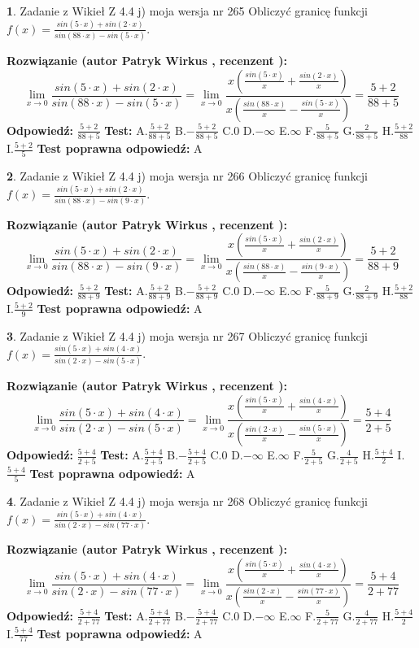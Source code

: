 \documentclass[12pt, a4paper]{article}
\theoremstyle{definition} %
\newtheorem{zad}{}
\newcommand{\zadStart}[1]{\begin{zad}#1\newline}
\newcommand{\zadStop}{\end{zad}}
\newcommand{\rozwStart}[2]{\noindent \textbf{Rozwiązanie (autor #1 , recenzent #2): }\newline}
\newcommand{\rozwStop}{\newline}
\newcommand{\odpStart}{\noindent \textbf{Odpowiedź:}\newline}
\newcommand{\odpStop}{\newline}
\newcommand{\testStart}{\noindent \textbf{Test:}\newline}
\newcommand{\testStop}{\newline}
\newcommand{\kluczStart}{\noindent \textbf{Test poprawna odpowiedź:}\newline}
\newcommand{\kluczStop}{\newline}
\begin{document}
\zadStart{Zadanie z Wikieł Z 4.4 j) moja wersja nr 265}
Obliczyć granicę funkcji $f(x)=\frac{sin(5\cdot x) +sin(2\cdot x)}{sin(88\cdot x) -sin(5\cdot x)}$.
\zadStop
\rozwStart{Patryk Wirkus}{}
$$\lim\limits_{x\to 0}\frac{sin(5\cdot x) +sin(2\cdot x)}{sin(88\cdot x) -sin(5\cdot x)}=\lim\limits_{x\to 0}\frac{x(\frac{sin(5\cdot x)}{x}+\frac{sin(2\cdot x)}{x})}{x(\frac{sin(88\cdot x)}{x}-\frac{sin(5\cdot x)}{x})}=\frac{5+2}{88+5}$$
\rozwStop
\odpStart
$\frac{5+2}{88+5}$
\odpStop
\testStart
A.$\frac{5+2}{88+5}$
B.$-\frac{5+2}{88+5}$
C.$0$
D.$-\infty$
E.$\infty$
F.$\frac{5}{88+5}$
G.$\frac{2}{88+5}$
H.$\frac{5+2}{88}$
I.$\frac{5+2}{5}$
\testStop
\kluczStart
A
\kluczStop



\zadStart{Zadanie z Wikieł Z 4.4 j) moja wersja nr 266}
Obliczyć granicę funkcji $f(x)=\frac{sin(5\cdot x) +sin(2\cdot x)}{sin(88\cdot x) -sin(9\cdot x)}$.
\zadStop
\rozwStart{Patryk Wirkus}{}
$$\lim\limits_{x\to 0}\frac{sin(5\cdot x) +sin(2\cdot x)}{sin(88\cdot x) -sin(9\cdot x)}=\lim\limits_{x\to 0}\frac{x(\frac{sin(5\cdot x)}{x}+\frac{sin(2\cdot x)}{x})}{x(\frac{sin(88\cdot x)}{x}-\frac{sin(9\cdot x)}{x})}=\frac{5+2}{88+9}$$
\rozwStop
\odpStart
$\frac{5+2}{88+9}$
\odpStop
\testStart
A.$\frac{5+2}{88+9}$
B.$-\frac{5+2}{88+9}$
C.$0$
D.$-\infty$
E.$\infty$
F.$\frac{5}{88+9}$
G.$\frac{2}{88+9}$
H.$\frac{5+2}{88}$
I.$\frac{5+2}{9}$
\testStop
\kluczStart
A
\kluczStop



\zadStart{Zadanie z Wikieł Z 4.4 j) moja wersja nr 267}
Obliczyć granicę funkcji $f(x)=\frac{sin(5\cdot x) +sin(4\cdot x)}{sin(2\cdot x) -sin(5\cdot x)}$.
\zadStop
\rozwStart{Patryk Wirkus}{}
$$\lim\limits_{x\to 0}\frac{sin(5\cdot x) +sin(4\cdot x)}{sin(2\cdot x) -sin(5\cdot x)}=\lim\limits_{x\to 0}\frac{x(\frac{sin(5\cdot x)}{x}+\frac{sin(4\cdot x)}{x})}{x(\frac{sin(2\cdot x)}{x}-\frac{sin(5\cdot x)}{x})}=\frac{5+4}{2+5}$$
\rozwStop
\odpStart
$\frac{5+4}{2+5}$
\odpStop
\testStart
A.$\frac{5+4}{2+5}$
B.$-\frac{5+4}{2+5}$
C.$0$
D.$-\infty$
E.$\infty$
F.$\frac{5}{2+5}$
G.$\frac{4}{2+5}$
H.$\frac{5+4}{2}$
I.$\frac{5+4}{5}$
\testStop
\kluczStart
A
\kluczStop



\zadStart{Zadanie z Wikieł Z 4.4 j) moja wersja nr 268}
Obliczyć granicę funkcji $f(x)=\frac{sin(5\cdot x) +sin(4\cdot x)}{sin(2\cdot x) -sin(77\cdot x)}$.
\zadStop
\rozwStart{Patryk Wirkus}{}
$$\lim\limits_{x\to 0}\frac{sin(5\cdot x) +sin(4\cdot x)}{sin(2\cdot x) -sin(77\cdot x)}=\lim\limits_{x\to 0}\frac{x(\frac{sin(5\cdot x)}{x}+\frac{sin(4\cdot x)}{x})}{x(\frac{sin(2\cdot x)}{x}-\frac{sin(77\cdot x)}{x})}=\frac{5+4}{2+77}$$
\rozwStop
\odpStart
$\frac{5+4}{2+77}$
\odpStop
\testStart
A.$\frac{5+4}{2+77}$
B.$-\frac{5+4}{2+77}$
C.$0$
D.$-\infty$
E.$\infty$
F.$\frac{5}{2+77}$
G.$\frac{4}{2+77}$
H.$\frac{5+4}{2}$
I.$\frac{5+4}{77}$
\testStop
\kluczStart
A
\kluczStop
\end{document}
